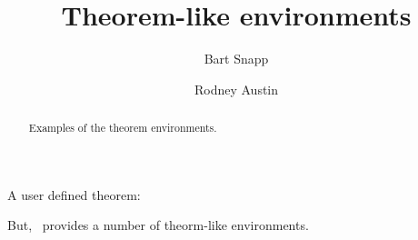 \documentclass{ximera}
\author{Bart Snapp \and Rodney Austin}
\title{Theorem-like environments}
\begin{document}
\begin{abstract}
  Examples of the theorem environments.
\end{abstract}
\maketitle

A user defined theorem: 
\begin{MM}
 \lipsum[1][1-3]
\end{MM}

But, \ximera\ provides a number of theorm-like environments.

\begin{theorem}
 \lipsum[1][1-3]
\end{theorem}

\begin{theorem}[My theorem]
   \lipsum[1][1-3]
\end{theorem}

\begin{algorithm}
  \lipsum[1][1-3]
\end{algorithm}

\begin{axiom}
  \lipsum[1][1-3]
\end{axiom}

\begin{claim}
  \lipsum[1][1-3]
\end{claim}

\begin{conclusion}
  \lipsum[1][1-3]
\end{conclusion}

\begin{condition}
  \lipsum[1][1-3]
\end{condition}

\begin{conjecture}
  \lipsum[1][1-3]
\end{conjecture}

\begin{corollary}
  \lipsum[1][1-3]
\end{corollary}

\begin{criterion}
  \lipsum[1][1-3]
\end{criterion}

\begin{definition}
  \lipsum[1][1-3]
\end{definition}

\begin{example}
  \lipsum[1][1-3]
\end{example}
\end{document}
